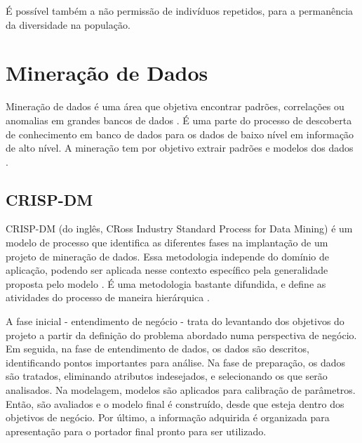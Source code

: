 É possível também a não permissão de indivíduos repetidos, para a permanência da diversidade na população.

\section{Mineração de Dados}
Mineração de dados é uma área que objetiva encontrar padrões, correlações ou 
anomalias em grandes bancos de dados \cite{learning_from_data}. É uma parte do
processo de descoberta de conhecimento em banco de dados para os dados de
baixo nível em informação de alto nível. A mineração tem por objetivo extrair 
padrões e modelos dos dados \cite{escolha_mineracao}.

\subsection{CRISP-DM}
CRISP-DM (do inglês, CRoss Industry Standard Process for Data Mining) é um modelo
de processo que identifica as diferentes fases na implantação de um projeto de
mineração de dados. Essa metodologia independe do domínio de aplicação, podendo
ser aplicada nesse contexto específico pela generalidade proposta pelo modelo
\cite{estudos_crisp}. É uma metodologia bastante difundida, e define as 
atividades do processo de maneira hierárquica \cite{crisp}.

A fase inicial - entendimento de negócio - trata do levantando dos objetivos do 
projeto a partir da definição do problema abordado numa perspectiva de negócio. 
Em seguida, na fase de entendimento de dados, os dados são descritos,
identificando pontos importantes para análise. Na fase de preparação, os dados 
são tratados, eliminando atributos indesejados, e selecionando os que serão
analisados. Na modelagem, modelos são aplicados para calibração de parâmetros.
Então, são avaliados e o modelo final é construído, desde que esteja dentro dos
objetivos de negócio. Por último, a informação adquirida é organizada para
apresentação para o portador final pronto para ser utilizado.

